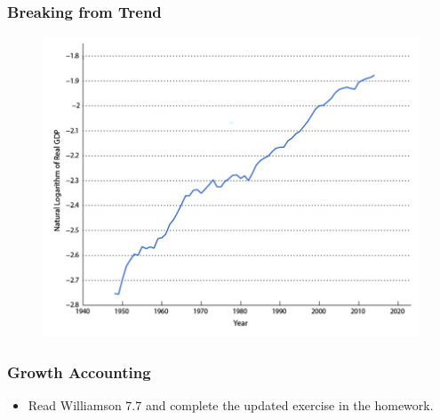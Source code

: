 \documentclass{beamer}
\begin{document}
\begin{frame}
\frametitle[alignment=center]{Breaking from Trend}
\begin{figure}
\centering
\includegraphics[scale=0.5]{Figures/W_Fig_7pt23.png}
\end{figure}
\end{frame}

\begin{frame}
\frametitle[alignment=center]{Growth Accounting}
\begin{itemize}
\item Read Williamson 7.7 and complete the updated exercise in the homework.
\end{itemize}
\end{frame}
\end{document}

